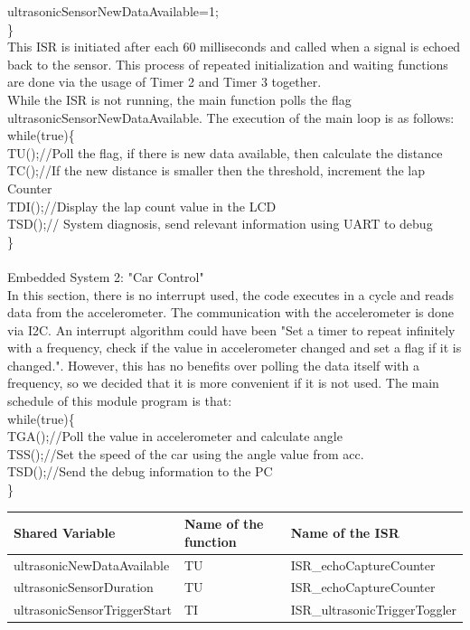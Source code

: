 \documentclass{article}
\begin{document}
ultrasonicSensorNewDataAvailable=1; \\
\}\\
This ISR is initiated after each 60 milliseconds and called when a signal is echoed back to the sensor.
This process of repeated initialization and waiting functions are done via the usage of Timer 2 and Timer 3
together.\\
While the ISR is not running, the main function polls the flag ultrasonicSensorNewDataAvailable.
The execution of the main loop is as follows:\\
while(true)\{\\
TU();//Poll the flag, if there is new data available, then calculate the distance\\
TC();//If the new distance is smaller then the threshold, increment the lap Counter\\
TDI();//Display the lap count value in the LCD\\
TSD();// System diagnosis, send relevant information using UART to debug\\
\}\\
\\
{\huge {Embedded System 2: "Car Control"}}
\\
In this section, there is no interrupt used, the code executes in a cycle and reads data from the
accelerometer. The communication with the accelerometer is done via I2C. An interrupt algorithm could have
been "Set a timer to repeat infinitely with a frequency, check if the value in accelerometer changed and
set a flag if it is changed.". However, this has no benefits over polling the data itself with a frequency,
so we decided that it is more convenient if it is not used. The main schedule of this module program is that:\\
while(true)\{\\
TGA();//Poll the value in accelerometer and calculate angle\\
TSS();//Set the speed of the car using the angle value from acc.\\
TSD();//Send the debug information to the PC\\
\}
\\[0.5in]
\begin{tabular}{| C{4cm} | C{4cm} | C{5cm} |}
\hline
Shared Variable&Name of the function&Name of the ISR\\
\hline
ultrasonicNewDataAvailable&TU& ISR\_echoCaptureCounter\\
\hline
ultrasonicSensorDuration&TU&ISR\_echoCaptureCounter\\
\hline
ultrasonicSensorTriggerStart&TI&ISR\_ultrasonicTriggerToggler\\
\hline
\end{tabular}
\end{document}
